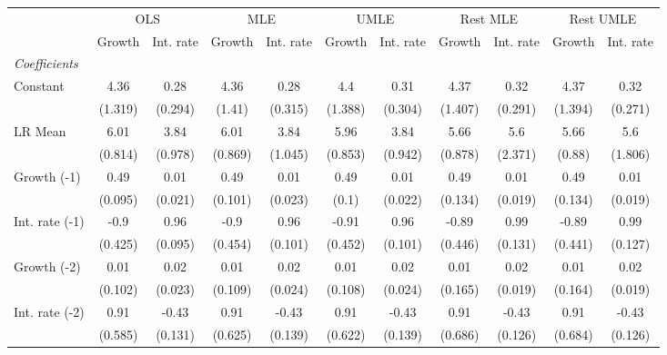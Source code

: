 \begin{table}[htbp] 
	\centering
	\begin{tabular}{@{\extracolsep{4pt}}lcccccccccc@{}}		\hline\hline
		 		 & \multicolumn{2}{c}{OLS} &\multicolumn{2}{c}{MLE} &\multicolumn{2}{c}{UMLE} &\multicolumn{2}{c}{Rest MLE} &\multicolumn{2}{c}{Rest UMLE} \\ 
 		 & Growth 	 & Int. rate 	 & Growth 	 & Int. rate 	 & Growth 	 & Int. rate 	 & Growth 	 & Int. rate 	 & Growth 	 & Int. rate\\\cline{2-3}\cline{4-5}\cline{6-7}\cline{8-9}\cline{10-11}
\rule{0pt}{4ex} 
 \emph{Coefficients} 	  		 & 		 & 		 & 		 & 		 & 		 & 		 & 		 & 		 & 		 &\\ 
\quad Constant 	 & 4.36 	 & 0.28 	 & 4.36 	 & 0.28 	 & 4.4 	 & 0.31 	 & 4.37 	 & 0.32 	 & 4.37 	 & 0.32	 \\ 
 		 & (1.319) 	 & (0.294) 	 & (1.41) 	 & (0.315) 	 & (1.388) 	 & (0.304) 	 & (1.407) 	 & (0.291) 	 & (1.394) 	 & (0.271) 	 \\ 
\quad LR Mean 	 & 6.01 	 & 3.84 	 & 6.01 	 & 3.84 	 & 5.96 	 & 3.84 	 & 5.66 	 & 5.6 	 & 5.66 	 & 5.6	 \\ 
 		 & (0.814) 	 & (0.978) 	 & (0.869) 	 & (1.045) 	 & (0.853) 	 & (0.942) 	 & (0.878) 	 & (2.371) 	 & (0.88) 	 & (1.806) 	 \\ 
\quad Growth (-1) 	 &0.49 	 & 0.01 	 & 0.49 	 & 0.01 	 & 0.49 	 & 0.01 	 & 0.49 	 & 0.01 	 & 0.49 	 & 0.01	 \\ 
 		 & (0.095) 	 & (0.021) 	 & (0.101) 	 & (0.023) 	 & (0.1) 	 & (0.022) 	 & (0.134) 	 & (0.019) 	 & (0.134) 	 & (0.019) 	 \\ 
\quad Int. rate (-1) 	 &-0.9 	 & 0.96 	 & -0.9 	 & 0.96 	 & -0.91 	 & 0.96 	 & -0.89 	 & 0.99 	 & -0.89 	 & 0.99	 \\ 
 		 & (0.425) 	 & (0.095) 	 & (0.454) 	 & (0.101) 	 & (0.452) 	 & (0.101) 	 & (0.446) 	 & (0.131) 	 & (0.441) 	 & (0.127) 	 \\ 
\quad Growth (-2) 	 &0.01 	 & 0.02 	 & 0.01 	 & 0.02 	 & 0.01 	 & 0.02 	 & 0.01 	 & 0.02 	 & 0.01 	 & 0.02	 \\ 
 		 & (0.102) 	 & (0.023) 	 & (0.109) 	 & (0.024) 	 & (0.108) 	 & (0.024) 	 & (0.165) 	 & (0.019) 	 & (0.164) 	 & (0.019) 	 \\ 
\quad Int. rate (-2) 	 &0.91 	 & -0.43 	 & 0.91 	 & -0.43 	 & 0.91 	 & -0.43 	 & 0.91 	 & -0.43 	 & 0.91 	 & -0.43	 \\ 
 		 & (0.585) 	 & (0.131) 	 & (0.625) 	 & (0.139) 	 & (0.622) 	 & (0.139) 	 & (0.686) 	 & (0.126) 	 & (0.684) 	 & (0.126) 	 \\ 

\end{tabular}
\end{table}
